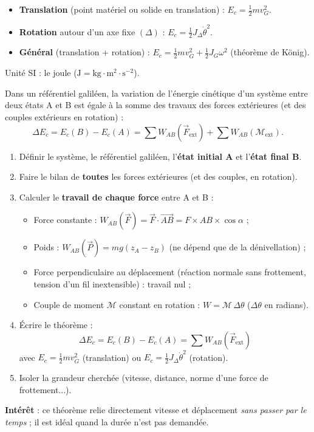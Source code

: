 \documentclass[11pt]{article}
\begin{document}
\begin{definition}
\begin{itemize}
\item \textbf{Translation} (point matériel ou solide en translation) : $E_c = \frac{1}{2}m v_G^2$.
\item \textbf{Rotation} autour d'un axe fixe $(\Delta)$ : $E_c = \frac{1}{2}J_{\Delta} \dot{\theta}^2$.
\item \textbf{Général} (translation + rotation) : $E_c = \frac{1}{2}m v_G^2 + \frac{1}{2}J_G \omega^2$ (théorème de König).
\end{itemize}
Unité SI : le joule ($\text{J} = \text{kg}\!\cdot\!\text{m}^2\!\cdot\!\text{s}^{-2}$).
\end{definition}

\begin{propriete}
Dans un référentiel galiléen, la variation de l'énergie cinétique d'un système entre deux états A et B est égale à la somme des travaux des forces extérieures (et des couples extérieurs en rotation) :
\[ \Delta E_c = E_c(B) - E_c(A) = \sum W_{AB}(\vec{F}_{\text{ext}}) + \sum W_{AB}(\mathcal{M}_{\text{ext}}). \]
\end{propriete}

\begin{methode}
\begin{enumerate}
\item Définir le système, le référentiel galiléen, l'\textbf{état initial A} et l'\textbf{état final B}.
\item Faire le bilan de \textbf{toutes} les forces extérieures (et des couples, en rotation).
\item Calculer le \textbf{travail de chaque force} entre A et B :
\begin{itemize}
\item Force constante : $W_{AB}(\vec{F}) = \vec{F}\cdot\overrightarrow{AB} = F \times AB \times \cos\alpha$ ;
\item Poids : $W_{AB}(\vec{P}) = mg(z_A - z_B)$ (ne dépend que de la dénivellation) ;
\item Force perpendiculaire au déplacement (réaction normale sans frottement, tension d'un fil inextensible) : travail nul ;
\item Couple de moment $\mathcal{M}$ constant en rotation : $W = \mathcal{M}\,\Delta\theta$ ($\Delta\theta$ en radians).
\end{itemize}
\item Écrire le théorème :
\[ \Delta E_c = E_c(B) - E_c(A) = \sum W_{AB}(\vec{F}_{\text{ext}}) \]
avec $E_c = \tfrac{1}{2}mv_G^2$ (translation) ou $E_c = \tfrac{1}{2}J_{\Delta}\dot{\theta}^2$ (rotation).
\item Isoler la grandeur cherchée (vitesse, distance, norme d'une force de frottement...).
\end{enumerate}
\textbf{Intérêt} : ce théorème relie directement vitesse et déplacement \emph{sans passer par le temps} ; il est idéal quand la durée n'est pas demandée.
\end{methode}
\end{document}
